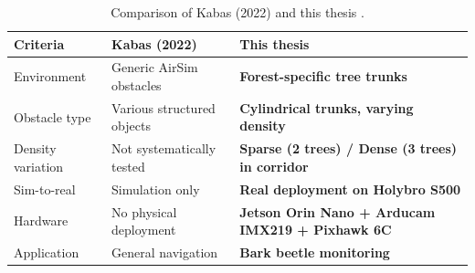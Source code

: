 \begin{table}[H]
    \small
    \centering
    \caption{Comparison of Kabas (2022) and this thesis \cite{Kabas2022}.}
    \label{tab:kabas_comparison}
    \begin{tabular}{p{4cm} p{4.5cm} p{4.5cm}}
        \hline\hline
        \rowcolor{lightgray}\textbf{Criteria} & \textbf{Kabas (2022)} & \textbf{This thesis} \\\hline
        Environment & Generic AirSim obstacles & \textbf{Forest-specific tree trunks} \\
        \rowcolor{lightlightgray} Obstacle type & Various structured objects & \textbf{Cylindrical trunks, varying density} \\
        Density variation & Not systematically tested & \textbf{Sparse (2 trees) / Dense (3 trees) in corridor} \\
        \rowcolor{lightlightgray} Sim-to-real & Simulation only & \textbf{Real deployment on Holybro S500} \\
        Hardware & No physical deployment & \textbf{Jetson Orin Nano + Arducam IMX219 + Pixhawk 6C} \\
        \rowcolor{lightlightgray} Application & General navigation & \textbf{Bark beetle monitoring} \\
        \hline
    \end{tabular}
\end{table}
